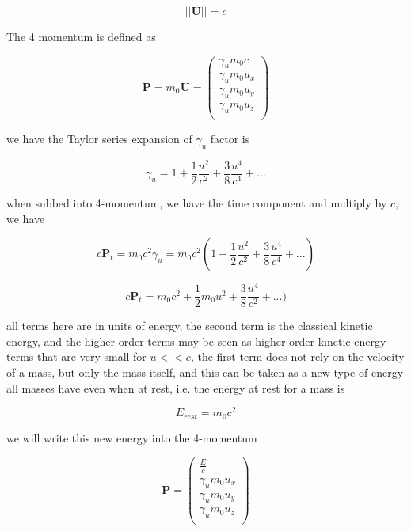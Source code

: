 \begin{equation}
	||\mathbf{U}|| = c
\end{equation}

The 4 momentum is defined as

\begin{equation}
	\mathbf{P} = m_0 \mathbf{U} =
	\begin{pmatrix}
		\gamma_u m_0 c   \\
		\gamma_u m_0 u_x \\
		\gamma_u m_0 u_y \\
		\gamma_u m_0 u_z \\
	\end{pmatrix}
\end{equation}

we have the Taylor series expansion of $\gamma_u$ factor is

\begin{equation}
	\gamma_u = 1 + \frac{1}{2}\frac{u^2}{c^2} + \frac{3}{8}\frac{u^4}{c^4} + ...
\end{equation}

when subbed into 4-momentum, we have the time component and multiply by $c$, we have

\begin{equation}
	c \mathbf{P}_t = m_0 c^2\gamma_u = m_0 c^2 ( 1 + \frac{1}{2}\frac{u^2}{c^2} +\frac{3}{8}\frac{u^4}{c^4} + ... )
\end{equation}

\begin{equation}
	c \mathbf{P}_t = m_0 c^2  + \frac{1}{2} m_0 u^2  + \frac{3}{8}\frac{u^4}{c^2} + ... )
\end{equation}

all terms here are in units of energy, the second term is the classical kinetic energy, and the higher-order terms may be seen as higher-order kinetic energy terms that are very small for $u<<c$, the first term does not rely on the velocity of a mass, but only the mass itself, and this can be taken as a new type of energy all masses have even when at rest, i.e. the energy at rest for a mass is

\begin{equation}
	E_{rest} = m_0 c^2
\end{equation}

we will write this new energy into the 4-momentum

\begin{equation}
	\mathbf{P} =
	\begin{pmatrix}
		\frac{E}{c}      \\
		\gamma_u m_0 u_x \\
		\gamma_u m_0 u_y \\
		\gamma_u m_0 u_z \\
	\end{pmatrix}
\end{equation}

